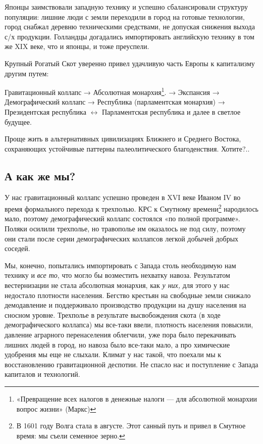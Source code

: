 Японцы заимствовали западную технику и успешно сбалансировали структуру популяции: лишние люди
с земли переходили в город на готовые технологии, город снабжал деревню техническими средствами, не допуская снижения
выхода с/х продукции. Голландцы догадались импортировать английскую технику в том же XIX 
веке, что и японцы, и тоже преуспели.


Крупный Рогатый Скот уверенно привел удачливую часть Европы к капитализму другим путем:


Гравитационный коллапс → Абсолютная монархия\footnote{«Превращение всех налогов в денежные налоги — для
абсолютной монархии вопрос жизни» (Маркс)}. → Экспансия → Демографический коллапс → Республика (парламентская
монархия) → Президентская республика $\leftrightarrow $ Парламентская республика и далее в светлое будущее.

Проще жить в альтернативных цивилизациях Ближнего и Среднего Востока, сохраняющих устойчивые паттерны палеолитического
благоденствия. Хотите?..

\subsection[А как же мы? ]{А как же мы? }

У нас гравитационный коллапс успешно проведен в \foreignlanguage{english}{XVI} веке Иваном \foreignlanguage{english}{IV}
во время формального перехода к трехполью. КРС к Смутному времени\footnote{В 1601 году Волга стала в
августе. Этот санный путь и привел в Смутное время: мы съели семенное зерно.} народилось мало, поэтому
демографический коллапс состоялся «по полной программе». Поляки осилили трехполье, но травополье им оказалось не под
силу, поэтому они стали после серии демографических коллапсов легкой добычей добрых соседей.


Мы, конечно, попытались импортировать с Запада столь необходимую нам технику и \textit{все то}, что могло бы возместить
нехватку навоза. Результатом вестернизации не стала абсолютная монархия, как \textit{у них,} для этого у нас недостало
плотности населения. Бегство крестьян на свободные земли снижало демодавление и поддерживало производство продукции на
душу населения на сносном уровне. Трехполье в результате высвобождения скота (в ходе демографического коллапса) мы
все-таки ввели, плотность населения повысили, давление аграрного перенаселения облегчили, уже пора было перекачивать
лишних людей в город, но навоза было все-таки мало, а про химические удобрения мы еще не слыхали. Климат у нас такой,
что поехали мы к восстановлению гравитационной деспотии. Не спасло нас и поступление с Запада капиталов и технологий.


